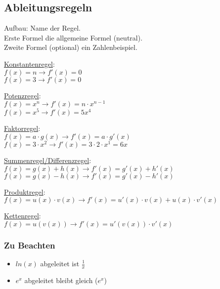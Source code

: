 \subsection{Ableitungsregeln}
\label{sec:ableitungs_regeln}
Aufbau: Name der Regel. \\
Erste Formel die allgemeine Formel (neutral). \\
Zweite Formel (optional) ein Zahlenbeispiel.
\par
\underline{Konstantenregel}: \\
$f(x) = n \rightarrow f'(x) = 0$ \\
$f(x) = 3 \rightarrow f'(x) = 0$ 
\par
\underline{Potenzregel}: \\
$f(x) = x^n \rightarrow f'(x) = n\cdot x^{n - 1}$ \\
$f(x) = x^5 \rightarrow f'(x) = 5x^{4}$ 
\par
\underline{Faktorregel}: \\
$f(x) = a\cdot g(x) \rightarrow f'(x) = a\cdot g'(x)$ \\
$f(x) = 3\cdot x^2 \rightarrow f'(x) = 3\cdot 2\cdot x^1 = 6x$ 
\par
\underline{Summenregel/Differenzregel}: \\
$f(x) = g(x) + h(x) \rightarrow f'(x) = g'(x) + h'(x)$ \\
$f(x) = g(x) - h(x) \rightarrow f'(x) = g'(x) - h'(x)$ 
\par
\underline{Produktregel}: \\
$f(x) = u(x) \cdot v(x) \rightarrow f'(x) = u'(x) \cdot v(x) + u(x) \cdot v'(x)$ 
\par
\underline{Kettenregel}: \\
$f(x) = u(v(x)) \rightarrow f'(x) = u'(v(x)) \cdot v'(x)$

\subsubsection{Zu Beachten}
\begin{itemize}
    \item $ln(x)$ abgeleitet ist $\frac{1}{x}$
    \item $e^x$ abgeleitet bleibt gleich ($e^x$)
\end{itemize}

